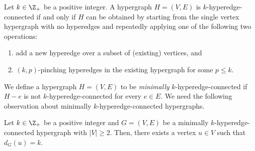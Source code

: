 \begin{theorem}\label{thm:k-EC-hypergraph-characterization}
    Let $k \in \Z_+$ be a positive integer. A hypergraph $H = (V, E)$ is $k$-hyperedge-connected if and only if $H$ can be obtained by starting from the single vertex hypergraph with no hyperedges and repeatedly applying one of the following two operations:
    \begin{enumerate}
        \item add a new hyperedge over a subset of (existing) vertices, and
        \item $(k, p)$-pinching hyperedges in the existing hypergraph for some $p \leq k$.
    \end{enumerate}
\end{theorem}
\fi
We define a hypergraph $H = (V, E)$ to be \emph{minimally} $k$-hyperedge-connected if $H-e$ is not $k$-hyperedge-connected for every $e\in E$. 
We need the following observation about minimally $k$-hyperedge-connected hypergraphs. %
\begin{lemma}\label{lem:minimally-k-EC-hypergraph-has-degree-k-vertex}
    Let $k \in \Z_+$ be a positive integer and $G = (V, E)$ be a minimally $k$-hyperedge-connected hypergraph with $|V| \geq 2$. Then, there exists a vertex $u \in V$ such that $d_G(u) = k$.
\end{lemma}
